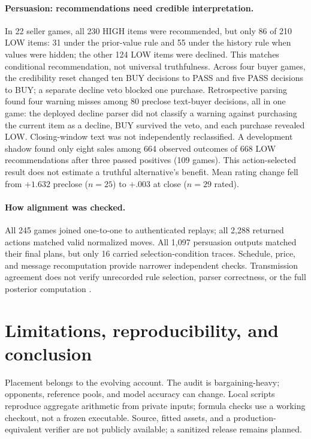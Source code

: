 \documentclass{article}
\begin{document}
\paragraph{Persuasion: recommendations need credible interpretation.}
In 22 seller games, all 230 HIGH items were recommended, but only 86 of 210
LOW items: 31 under the prior-value rule and 55 under the history rule when
values were hidden; the other 124 LOW items were declined. This matches
conditional recommendation, not universal truthfulness.
Across four buyer games, the credibility reset changed ten BUY decisions to
PASS and five PASS decisions to BUY; a separate decline veto blocked one
purchase. Retrospective parsing found four warning misses among 80 preclose
text-buyer decisions, all in one game: the deployed decline parser did not classify a warning against
purchasing the current item as a decline, BUY survived the veto, and each
purchase revealed LOW. Closing-window text was not independently reclassified.
A development shadow found only eight sales among 664 observed outcomes of
668 LOW recommendations after three passed positives (109 games). This
action-selected result does not estimate a truthful alternative's benefit.
Mean rating change fell from $+1.632$ preclose ($n=25$) to $+.003$ at close
($n=29$ rated).

\paragraph{How alignment was checked.}
All 245 games joined one-to-one to authenticated replays; all 2,288 returned
actions matched valid normalized moves. All 1,097 persuasion outputs matched
their final plans, but only 16 carried selection-condition traces. Schedule,
price, and message recomputation provide narrower independent checks.
Transmission agreement does not verify unrecorded rule selection, parser
correctness, or the full posterior computation
\citep{seyedghorban2026observability,zhang2025agentracer}.

\section{Limitations, reproducibility, and conclusion}

Placement belongs to the evolving account. The audit is bargaining-heavy;
opponents, reference pools, and model accuracy can change. Local scripts reproduce
aggregate arithmetic from private inputs; formula checks use a working checkout,
not a frozen executable. Source, fitted assets, and a production-equivalent
verifier are not publicly available; a sanitized release remains planned.
\end{document}
